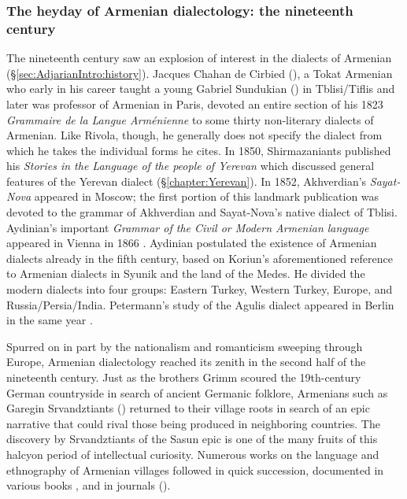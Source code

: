 \documentclass[output=paper]{langscibook}
\begin{document}
\subsubsection{The heyday of Armenian dialectology: the nineteenth century}\label{sec:vaux:dialectology:past:19}
	


The nineteenth century saw an explosion of interest in the dialects of Armenian (\S\ref{sec:AdjarianIntro:history}). Jacques Chahan de Cirbied (), a Tokat Armenian who early in his career taught a young Gabriel Sundukian () in Tblisi/Tiflis and later was professor of Armenian in Paris, devoted an entire section of his 1823 \textit{Grammaire de la Langue Arménienne} \citep{Cirbied-1823-GrammarArmenian} to some thirty non-literary dialects of Armenian. Like Rivola, though, he generally does not specify the dialect from which he takes the individual forms he cites. In 1850, Shirmazaniants \citep{Shirmazaniants-1850-StorieslanguageYerevantsis} published his  \textit{Stories in the Language of the people of Yerevan}  which discussed general features of the Yerevan dialect (\S\ref{chapter:Yerevan}). In 1852, Akhverdian's \textit{Sayat-Nova} \citep{SayatNova} appeared in Moscow; the first portion of this landmark publication was devoted to the grammar of Akhverdian and Sayat-Nova's native dialect of Tblisi. Aydinian's  important \textit{Grammar of the Civil or Modern Armenian language} appeared in Vienna in 1866 \citep{Aydinian-1866-CriticalGrammarArmenian}. Aydinian postulated the existence of Armenian dialects already in the fifth century, based on   Koriun's  aforementioned reference to Armenian dialects in   Syunik  and the land of the Medes. He divided the modern dialects into four groups: Eastern Turkey, Western Turkey, Europe, and Russia/Persia/India. Petermann's study of the Agulis dialect appeared in Berlin in the same year \citep{Petermann-1867-Agulis}.	



Spurred on in part by the nationalism and romanticism sweeping through Europe, Armenian dialectology reached its zenith in the second half of the nineteenth century. Just as the brothers Grimm scoured the 19th-century German countryside in search of     ancient Germanic folklore, Armenians such as Garegin Srvandztiants () returned to their village roots in search of an epic narrative that could rival those being produced in neighboring countries. The discovery by Srvandztiants of the Sasun epic \citep[cf.][]{manana} is one of the many fruits of this halcyon period of intellectual curiosity. Numerous works on the language and ethnography of Armenian villages followed in quick succession, documented in various books \citep{Setrakyan-1875-LyreMushVan,Allahverdian-1884-UlniaZeytun,Sherents-1885-VanaSaz1,Sherents-1899-VanaSaz2,Shatakhi-1913-VaspurakanFolkoreShatakih},      and in journals  ().   
\end{document}
